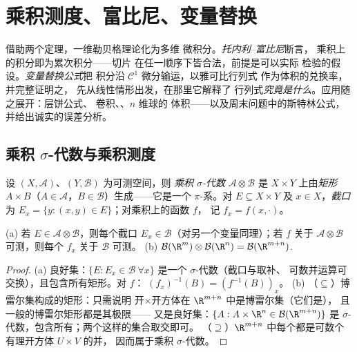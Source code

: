 \chapter{乘积测度、富比尼、变量替换}
\label{ch:b3:product}

借助两个定理，一维勒贝格理论化为多维
微积分。\emph{托内利--富比尼}断言，
乘积上的积分即为累次积分——切片
在任一顺序下皆合法，前提是可以实际
检验的假设。\emph{变量替换公式}把
积分沿 $\mathcal C^1$ 微分输运，以雅可比行列式
作为体积的兑换率，并完整证明之，
先从线性情形出发，在那里它解释了
行列式\emph{究竟是什么}。应用随之展开：层饼公式、
卷积、、$n$ 维球的
体积——以及周末问题中的斯特林公式，
并给出诚实的误差分析。

\section{乘积 $\sigma$-代数与乘积测度}

\begin{definition}\label{def:b3:product:sigma}
设 $(X, \mathcal A)$、$(Y, \mathcal B)$ 为可测空间，则
\emph{乘积 $\sigma$-代数} $\mathcal A \otimes \mathcal B$ 是 $X \times
Y$ 上由\emph{矩形} $A \times B$（$A \in
\mathcal A$，$B \in \mathcal B$）生成——它是一个 $\pi$-系。对 $E
\subseteq X\times Y$ 及 $x \in X$，\emph{截口}为 $E_x
= \{y : (x,y) \in E\}$；对乘积上的函数 $f$，
记 $f_x = f(x, \cdot)$。
\end{definition}

\begin{proposition}\label{prop:b3:product:sections}
(a) 若 $E \in \mathcal A\otimes\mathcal B$，则每个截口 $E_x
\in \mathcal B$（对另一个变量同理）；若 $f$ 关于 $\mathcal
A\otimes\mathcal B$ 可测，则每个 $f_x$ 关于 $\mathcal
B$ 可测。
(b) $\mathcal B(\R^m)\otimes\mathcal B(\R^n) = \mathcal
B(\R^{m+n})$.
\end{proposition}

\begin{proof}
(a) 良好集：$\{E : E_x \in \mathcal B\ \forall x\}$ 是一个
$\sigma$-代数（截口与取补、
可数并运算可交换），且包含所有矩形。对 $f$：
$(f_x)^{-1}(B) = (f^{-1}(B))_x$。
(b) （$\subseteq$）博雷尔集构成的矩形：只需说明
开$\times$开方体在 $\R^{m+n}$ 中是博雷尔集（它们是），
且一般的博雷尔矩形都是其极限——
又是良好集：$\{A : A\times\R^n \in \mathcal B(\R^{m+n})\}$ 是
$\sigma$-代数，包含所有；两个这样的集合取交即可。
（$\supseteq$）$\R^{m+n}$ 中每个都是可数个
有理开方体 $U\times V$ 的并，
因而属于乘积 $\sigma$-代数。
\end{proof}

